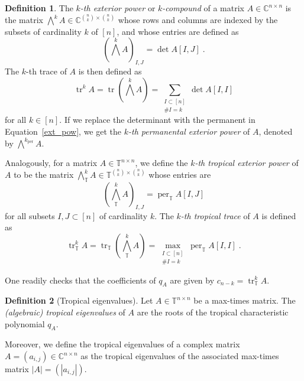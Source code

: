\documentclass[a4paper]{amsart}
\theoremstyle{definition}
\newtheorem{defn}{Definition}
\theoremstyle{plain}
\theoremstyle{remark}
\begin{document}
\begin{defn}
The \emph{$k$-th exterior power} 
or \emph{$k$-compound} of a matrix $A \in {\mathbb{C}}^{n \times n}$ is the matrix
${{\mbox{$\bigwedge$}}^k A \in {\mathbb{C}}^{\binom{n}{k} \times \binom{n}{k}}}$
whose rows and columns are indexed by the subsets of cardinality $k$ of 
$[n]$,
and whose entries are defined as
\begin{equation} \label{ext_pow}
	{\left( {\mbox{$\bigwedge$}}^k A \right)}_{I,J} = \det A[I,J] \; .
\end{equation}
The $k$-th trace of $A$ is then defined as 
\[ \operatorname{tr}^k A = \operatorname{tr} \left( {\mbox{$\bigwedge$}}^k A \right) = \sum_{\substack{I \subset [n] \\ {\# {I}} = k}} \det A[I,I] \]
for all $k \in [n]$.
If we replace the determinant with the permanent in Equation~\eqref{ext_pow},
we get the \emph{$k$-th permanental exterior power} of $A$, denoted by ${\mbox{$\bigwedge$}}^k_\operatorname{per} A$.

Analogously, for a matrix $A \in {{\mathbb{T}}}^{n \times n}$, we define
the \emph{$k$-th tropical exterior power} of $A$ to be the matrix 
${{\mbox{$\bigwedge$}}^k_{{\mathbb{T}}} A \in  {{\mathbb{T}}}^{\binom{n}{k} \times \binom{n}{k}}}$ whose entries are
\[ {\left( {\mbox{$\bigwedge$}}^k_{{\mathbb{T}}} A \right)}_{I,J} = \operatorname{per}_{{\mathbb{T}}} A[I,J] \]
for all subsets $I, J \subset [n]$ of cardinality $k$.
The \emph{$k$-th tropical trace} of $A$ is defined as 
\begin{equation}\label{tropical_trace}
	\operatorname{tr}^k_{{\mathbb{T}}} A = \operatorname{tr}_{{\mathbb{T}}} \left( {\mbox{$\bigwedge$}}^k_{{\mathbb{T}}} A \right) 
	= \max_{\substack{I \subset [n] \\ {\# {I}} = k}} \operatorname{per}_{{\mathbb{T}}} A[I,I] \; .
\end{equation}
\end{defn}

One readily checks that the coefficients of $q_A$
are given by $c_{n-k} = \operatorname{tr}^k_{{\mathbb{T}}} A$.

\begin{defn}[Tropical eigenvalues]
	Let $A \in {{\mathbb{T}}}^{n \times n}$ be a max-times matrix.
	The \emph{(algebraic) tropical eigenvalues} of $A$ are the roots
	of the tropical characteristic polynomial $q_A$.
	
	Moreover, we define the tropical eigenvalues of a complex matrix $A = (a_{i,j}) \in {\mathbb{C}}^{n \times n}$
	as the tropical eigenvalues of the associated max-times matrix $|A| = (|a_{i,j}|)$.
\end{defn}
\end{document}
